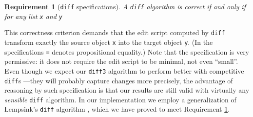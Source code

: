 \documentclass{sigplanconf}
\theoremstyle{plain}
\newtheorem{prop}{Proposition}
\newtheorem{req}{Requirement}
\begin{document}
\begin{req}[\texttt{diff} specifications]
  \label{req:diff-specs}
  A \texttt{diff} algorithm is correct if and only if for any list
  \texttt{x} and \texttt{y} 
\end{req}
%
This correctness criterion demands that the edit script computed by
\texttt{diff} transform exactly the source object \texttt{x} into the
target object \texttt{y}.  (In the specifications \texttt{≡} denotes
propositional equality.)
%
Note that the specification is very permissive: it does not require 
the edit script to be minimal, not even ``small''.
%
Even though we expect our \texttt{diff3} algorithm to perform better
with competitive \texttt{diff}s ---they will probably capture changes
more precisely, the advantage of reasoning by such specification is
that our results are still valid with virtually any \emph{sensible}
\texttt{diff} algorithm.
%
In our implementation we employ a generalization of Lempsink's
\texttt{diff} algorithm \cite{Lemp09}, which we have proved to meet
Requirement \ref{req:diff-specs}.
\end{document}
